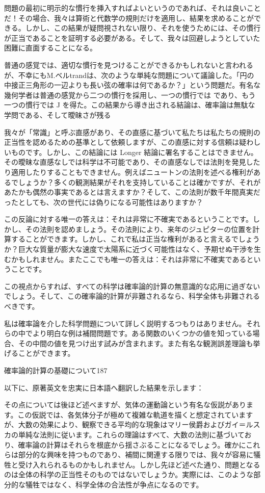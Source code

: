 \documentclass[a4paper,11pt,openany]{ltjsbook}
\begin{document}
問題の最初に明示的な慣行を挿入すればよいというのであれば、それは良いことだ！その場合、我々は算術と代数学の規則だけを適用し、結果を求めることができる。しかし、この結果が疑問視されない限り、それを使うためには、その慣行が正当であることを証明する必要がある。そして、我々は回避しようとしていた困難に直面することになる。

普通の感覚では、適切な慣行を見つけることができるかもしれないと言われるが、不幸にもM.ベルtrandは、次のような単純な問題について議論した。「円の中接正三角形の一辺よりも長い弦の確率は何であるか？」という問題だ。有名な幾何学者は普通の感覚から二つの慣行を採用し、一つの慣行では  であり、もう一つの慣行では J を得た。この結果から導き出される結論は、確率論は無駄な学問である、そして曖昧さが残る



我々が「常識」と呼ぶ直感があり、その直感に基づいて私たちは私たちの規則の正当性を認めるための基準として依頼しますが、この直感に対する信頼は疑わしいものです。しかし、この結論には Longer 結論に署名することはできません。その曖昧な直感なしでは科学は不可能であり、その直感なしでは法則を発見したり適用したりすることもできません。例えばニュートンの法則を述べる権利があるでしょうか？多くの観測結果がそれを支持していることは確かですが、それがあたかも偶然の事実であるとは言えますか？そして、この法則が数千年間真実だったとしても、次の世代には偽りになる可能性はありますか？

この反論に対する唯一の答えは：それは非常に不確実であるということです。しかし、その法則を認めましょう。その法則により、来年のジュピターの位置を計算することができます。しかし、これで私は正当な権利があると言えるでしょうか？巨大な質量が膨大な速度で太陽系に近づく可能性はなく、予期せぬ干渉を生むかもしれません。またここでも唯一の答えは：それは非常に不確実であるということです。

この視点からすれば、すべての科学は確率論的計算の無意識的な応用に過ぎないでしょう。そして、この確率論的計算が非難されるなら、科学全体も非難されるべきです。

私は確率論を介した科学問題について詳しく説明するつもりはありません。それらの中でより明白な例は補間問題です。ある関数のいくつかの値を知っている場合、その中間の値を見つけ出す試みが含まれます。また有名な観測誤差理論も挙げることができます。

確率論的計算の基礎について187

以下に、原著英文を忠実に日本語へ翻訳した結果を示します：

その点については後ほど述べますが、気体の運動論という有名な仮説があります。この仮説では、各気体分子が極めて複雑な軌道を描くと想定されていますが、大数の効果により、観察できる平均的な現象はマリー侯爵およびガイ＝ルスカの単純な法則に従います。これらの理論はすべて、大数の法則に基づいており、確率論の計算はそれらを根底から揺さぶることになるでしょう。確かにこれらは部分的な興味を持つものであり、補間に関連する限りでは、我々が容易に犠牲と受け入れられるものかもしれません。しかし先ほど述べた通り、問題となるのは全体の科学の正当性そのものではないでしょうか。実際には、このような部分的な犠牲ではなく、科学全体の合法性が争点になるのです。
\end{document}
